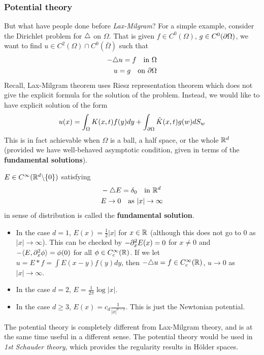 \documentclass[12pt,a4paper]{article}
\begin{document}
\subsubsection*{Potential theory}

But what have people done before \emph{Lax-Milgram}? For a simple example, consider the Dirichlet problem for $\triangle$ on $\Omega$. That is given $f\in C^0(\Omega)$, $g\in C^0(\partial \Omega)$, we want to find $u\in C^2(\Omega) \cap C^0(\bar{\Omega})$ such that
\begin{align*}
-\triangle u = f \quad \text{in } \Omega \\
u =g \quad \text{on } \partial \Omega
\end{align*}
Recall, Lax-Milgram theorem uses Riesz representation theorem which does not give the explicit formula for the solution of the problem. Instead, we would like to have explicit solution of the form
\begin{align*}
u(x) = \int_{\Omega} K(x,t) f(y) dy + \int_{\partial \Omega}\tilde{K}(x,t) g(w) dS_w
\end{align*}
This is in fact achievable when $\Omega$ is a ball, a half space, or the whole $\mathbb{R}^d$ (provided we have well-behaved asymptotic condition, given in terms of the \textbf{fundamental solutions}).
\s

 $E\in C^{\infty}(\mathbb{R}^d \backslash \{0\})$ satisfying
\begin{align*}
& -\triangle E = \delta_{0} \quad \text{in }\mathbb{R}^d \\
& E\rightarrow 0 \quad \text{as } |x|\rightarrow \infty 
\end{align*}
in sense of distribution is called the \textbf{fundamental solution}.
\begin{itemize}
\item In the case $d=1$, $E(x) = \frac{1}{2} |x|$ for $x\in \mathbb{R}$ (although this does not go to 0 as $|x|\rightarrow \infty$). This can be checked by $-\partial_x^2 E(x)=0$ for $x\neq 0$ and $-\langle E, \partial_x^2 \phi\rangle = \phi(0)$ for all $\phi \in C_c^{\infty}(\mathbb{R})$. If we let $u= E * f = \int E(x-y)f(y) dy$, then $-\triangle u = f \in C_c^{\infty}(\mathbb{R})$, $u\rightarrow 0$ as $|x|\rightarrow \infty$.
\item In the case $d=2$, $E=\frac{1}{2\pi} \log |x|$.
\item In the case $d\geq 3$, $E(x)= c_d \frac{1}{|x|^{d-2}}$. This is just the Newtonian potential. 
\end{itemize}
The potential theory is completely different from Lax-Milgram theory, and is at the same time useful in a different sense. The potential theory would be used in \emph{1st Schauder theory}, which provides the regularity results in H\"{o}lder spaces.
\end{document}
